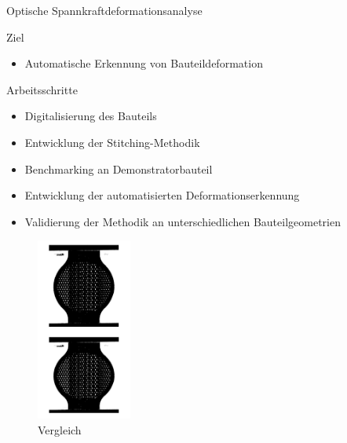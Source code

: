 \documentclass[../slides.tex]{subfiles}
\begin{document}
\begin{frame}{Optische Spannkraftdeformationsanalyse}
  \begin{minipage}[]{0.6\textwidth}
    \begin{block}{Ziel}
      \begin{itemize}
        \item Automatische Erkennung von Bauteildeformation 
      \end{itemize}
    \end{block}
    \begin{block}{Arbeitsschritte}
      \begin{itemize}
        \item Digitalisierung des Bauteils
        \item Entwicklung der Stitching-Methodik
        \item Benchmarking an Demonstratorbauteil
        \item Entwicklung der automatisierten Deformationserkennung
        \item Validierung der Methodik an unterschiedlichen Bauteilgeometrien
      \end{itemize}
    \end{block}
  \end{minipage}
  \begin{minipage}[]{0.39\textwidth}
    \begin{figure}[]
      \includegraphics[height=170pt]{img_niklas/compare.png}
      \caption{Vergleich}
    \end{figure}
  \end{minipage}
\end{frame}
\end{document}
